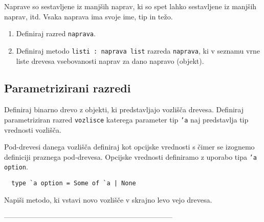 \begin{ex}
  Naprave so sestavljene iz manj\v sih naprav, ki so spet lahko
  sestavljene iz manj\v sih naprav, itd. Vsaka naprava ima svoje ime,
  tip in te\v zo.
  
  \begin{enumerate}[label=(\Alph*)]
  \item Definiraj razred \texttt{naprava}.

  \item Definiraj metodo \texttt{listi : naprava list} razreda
    \texttt{naprava}, ki v seznamu vrne liste drevesa vsebovanosti
    naprav za dano napravo (objekt).
  \end{enumerate}


\end{ex} 

\subsection{Parametrizirani razredi}

\begin{ex}
  Definiraj binarno drevo z objekti, ki predstavljajo vozli\v s\v
  ca drevesa. Definiraj parametriziran razred \texttt{vozlisce}
  katerega parameter tip \texttt{'a} naj predstavlja tip vrednosti
  vozli\v s\v ca.

  Pod-drevesi danega vozli\v s\v ca definiraj kot opcijske vrednosti s
  \v cimer se izognemo definiciji praznega pod-drevesa. Opcijske
  vrednosti definiramo z uporabo tipa \texttt{'a option}.

  \begin{verbatim}
  type `a option = Some of `a | None
  \end{verbatim}

  Napi\v si metodo, ki vstavi novo vozli\v s\v ce v skrajno levo vejo
  drevesa.

 
\end{ex} 



-----------------------------------------------------------------------


